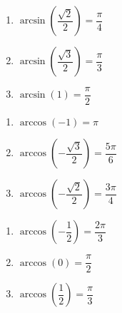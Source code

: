 \begin{multicols}{3} 

\begin{enumerate}

\setcounter{enumi}{\value{HW}}

\item $\arcsin \left( \dfrac{\sqrt{2}}{2} \right) = \dfrac{\pi}{4}$
\item $\arcsin \left( \dfrac{\sqrt{3}}{2} \right) = \dfrac{\pi}{3}$
\item $\arcsin \left( 1 \right) = \dfrac{\pi}{2}$ 

\setcounter{HW}{\value{enumi}}

\end{enumerate}

\end{multicols}

\begin{multicols}{3} 

\begin{enumerate}

\setcounter{enumi}{\value{HW}}

\item $\arccos \left( -1 \right) = \pi$ 
\item $\arccos \left( -\dfrac{\sqrt{3}}{2} \right) = \dfrac{5\pi}{6}$
\item $\arccos \left( -\dfrac{\sqrt{2}}{2} \right) = \dfrac{3\pi}{4}$

\setcounter{HW}{\value{enumi}}

\end{enumerate}

\end{multicols}

\begin{multicols}{3} 

\begin{enumerate}

\setcounter{enumi}{\value{HW}}

\item $\arccos \left( -\dfrac{1}{2} \right) = \dfrac{2\pi}{3}$
\item $\arccos \left( 0 \right) = \dfrac{\pi}{2}$ 
\item $\arccos \left( \dfrac{1}{2} \right) = \dfrac{\pi}{3}$

\setcounter{HW}{\value{enumi}}

\end{enumerate}

\end{multicols}

